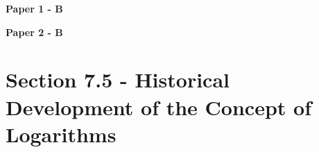 \documentclass[12pt, a4paper]{article}
\begin{document}
\textbf{Paper 1 - B}
\begin{enumx}[label=\arabic*.,start=20]
\item {}\label{DSE2024-CoreP1-Q15} 
\end{enumx}
\textbf{Paper 2 - B}
\begin{enumx}[label=\arabic*.,start=21]
\item {}\label{DSE2013-CoreP2-Q32} 
\item {}\label{DSE2014-CoreP2-Q32} 
\item {}\label{DSE2018-CoreP2-Q32} 
\item {}\label{DSE2020-CoreP2-Q34} 
\item {}\label{DSE2021-CoreP2-Q33} 
\end{enumx}




\section*{Section 7.5 - Historical Development of the Concept of Logarithms \NF}\label{section:4-7-5}
\end{document}
